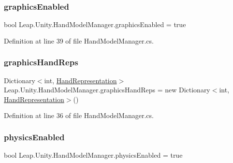 \subsubsection{\texorpdfstring{graphicsEnabled}{graphicsEnabled}}
{\footnotesize\ttfamily bool Leap.\+Unity.\+Hand\+Model\+Manager.\+graphics\+Enabled = true\hspace{0.3cm}{\ttfamily [protected]}}



Definition at line 39 of file Hand\+Model\+Manager.\+cs.

\mbox{\label{class_leap_1_1_unity_1_1_hand_model_manager_a3966c995e00f366b661342a1c1ac371d}} 
\subsubsection{\texorpdfstring{graphicsHandReps}{graphicsHandReps}}
{\footnotesize\ttfamily Dictionary$<$int, \mbox{\hyperlink{class_leap_1_1_unity_1_1_hand_representation}{Hand\+Representation}}$>$ Leap.\+Unity.\+Hand\+Model\+Manager.\+graphics\+Hand\+Reps = new Dictionary$<$int, \mbox{\hyperlink{class_leap_1_1_unity_1_1_hand_representation}{Hand\+Representation}}$>$()\hspace{0.3cm}{\ttfamily [protected]}}



Definition at line 36 of file Hand\+Model\+Manager.\+cs.

\mbox{\label{class_leap_1_1_unity_1_1_hand_model_manager_aa86eb54a713c69895ab326bea1ef0718}} 
\subsubsection{\texorpdfstring{physicsEnabled}{physicsEnabled}}
{\footnotesize\ttfamily bool Leap.\+Unity.\+Hand\+Model\+Manager.\+physics\+Enabled = true\hspace{0.3cm}{\ttfamily [protected]}}



